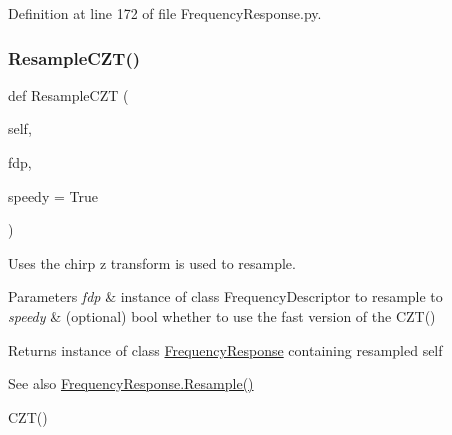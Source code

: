 Definition at line 172 of file Frequency\+Response.\+py.

\mbox{\label{classSignalIntegrity_1_1FrequencyDomain_1_1FrequencyResponse_1_1FrequencyResponse_af61ffacaaef319b5b0752778bfe522e6}} 
\subsubsection{\texorpdfstring{Resample\+C\+Z\+T()}{ResampleCZT()}}
{\footnotesize\ttfamily def Resample\+C\+ZT (\begin{DoxyParamCaption}\item[{}]{self,  }\item[{}]{fdp,  }\item[{}]{speedy = {\ttfamily True} }\end{DoxyParamCaption})}



Uses the chirp z transform is used to resample. 


\begin{DoxyParams}{Parameters}
{\em fdp} & instance of class Frequency\+Descriptor to resample to \\
\hline
{\em speedy} & (optional) bool whether to use the fast version of the C\+Z\+T() \\
\hline
\end{DoxyParams}
\begin{DoxyReturn}{Returns}
instance of class \hyperlink{classSignalIntegrity_1_1FrequencyDomain_1_1FrequencyResponse_1_1FrequencyResponse}{Frequency\+Response} containing resampled self 
\end{DoxyReturn}
\begin{DoxySeeAlso}{See also}
\hyperlink{classSignalIntegrity_1_1FrequencyDomain_1_1FrequencyResponse_1_1FrequencyResponse_a6aa7e8bdecb4f17e41d783d00a27fdd8}{Frequency\+Response.\+Resample()} 

C\+Z\+T() 
\end{DoxySeeAlso}


